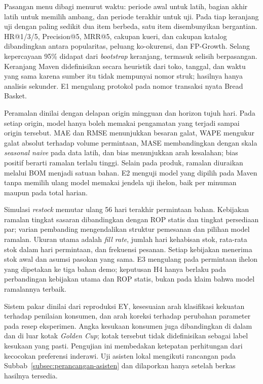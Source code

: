 Pasangan menu dibagi menurut waktu: periode awal untuk latih, bagian akhir latih untuk memilih ambang, dan periode terakhir untuk uji. Pada tiap keranjang uji dengan paling sedikit dua item berbeda, satu item disembunyikan bergantian. HR@1/3/5, Precision@5, MRR@5, cakupan kueri, dan cakupan katalog dibandingkan antara popularitas, peluang ko-okurensi, dan FP-Growth. Selang kepercayaan 95\% didapat dari \textit{bootstrap} keranjang, termasuk selisih berpasangan. Keranjang Maven didefinisikan secara heuristik dari toko, tanggal, dan waktu yang sama karena sumber itu tidak mempunyai nomor struk; hasilnya hanya analisis sekunder. E1 mengulang protokol pada nomor transaksi nyata Bread Basket.

Peramalan dinilai dengan delapan origin mingguan dan horizon tujuh hari. Pada setiap origin, model hanya boleh memakai pengamatan yang terjadi sampai origin tersebut. MAE dan RMSE menunjukkan besaran galat, WAPE mengukur galat absolut terhadap volume permintaan, MASE membandingkan dengan skala \textit{seasonal naive} pada data latih, dan bias menunjukkan arah kesalahan; bias positif berarti ramalan terlalu tinggi. Selain pada produk, ramalan diuraikan melalui BOM menjadi satuan bahan. E2 menguji model yang dipilih pada Maven tanpa memilih ulang model memakai jendela uji ihelon, baik per minuman maupun pada total harian.

Simulasi \textit{restock} memutar ulang 56 hari terakhir permintaan bahan. Kebijakan ramalan tingkat sasaran dibandingkan dengan ROP statis dan tingkat persediaan par; varian pembanding mengendalikan struktur pemesanan dan pilihan model ramalan. Ukuran utama adalah \textit{fill rate}, jumlah hari kehabisan stok, rata-rata stok dalam hari permintaan, dan frekuensi pesanan. Setiap kebijakan menerima stok awal dan asumsi pasokan yang sama. E3 mengulang pada permintaan ihelon yang dipetakan ke tiga bahan demo; keputusan H4 hanya berlaku pada perbandingan kebijakan utama dan ROP statis, bukan pada klaim bahwa model ramalannya terbaik.

Sistem pakar dinilai dari reproduksi EY, kesesuaian arah klasifikasi kekuatan terhadap penilaian konsumen, dan arah koreksi terhadap perubahan parameter pada resep eksperimen. Angka kesukaan konsumen juga dibandingkan di dalam dan di luar kotak \textit{Golden Cup}; kotak tersebut tidak didefinisikan sebagai label kesukaan yang pasti. Pengujian ini membedakan ketepatan perhitungan dari kecocokan preferensi inderawi. Uji asisten lokal mengikuti rancangan pada Subbab~\ref{subsec:perancangan-asisten} dan dilaporkan hanya setelah berkas hasilnya tersedia.

